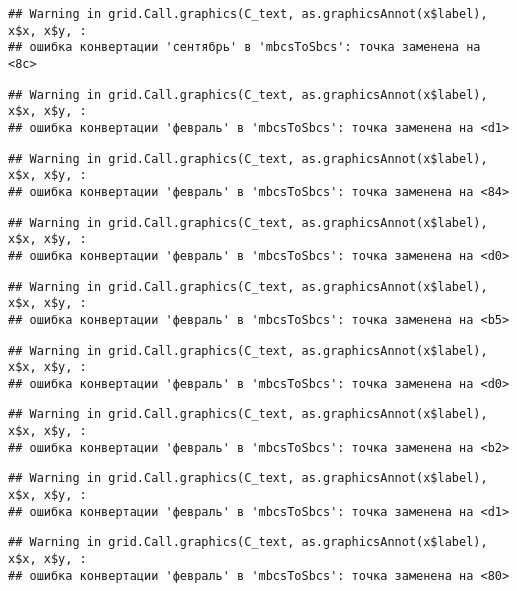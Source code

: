 \documentclass[
]{article}
\begin{document}
\begin{verbatim}
## Warning in grid.Call.graphics(C_text, as.graphicsAnnot(x$label), x$x, x$y, :
## ошибка конвертации 'сентябрь' в 'mbcsToSbcs': точка заменена на <8c>
\end{verbatim}

\begin{verbatim}
## Warning in grid.Call.graphics(C_text, as.graphicsAnnot(x$label), x$x, x$y, :
## ошибка конвертации 'февраль' в 'mbcsToSbcs': точка заменена на <d1>
\end{verbatim}

\begin{verbatim}
## Warning in grid.Call.graphics(C_text, as.graphicsAnnot(x$label), x$x, x$y, :
## ошибка конвертации 'февраль' в 'mbcsToSbcs': точка заменена на <84>
\end{verbatim}

\begin{verbatim}
## Warning in grid.Call.graphics(C_text, as.graphicsAnnot(x$label), x$x, x$y, :
## ошибка конвертации 'февраль' в 'mbcsToSbcs': точка заменена на <d0>
\end{verbatim}

\begin{verbatim}
## Warning in grid.Call.graphics(C_text, as.graphicsAnnot(x$label), x$x, x$y, :
## ошибка конвертации 'февраль' в 'mbcsToSbcs': точка заменена на <b5>
\end{verbatim}

\begin{verbatim}
## Warning in grid.Call.graphics(C_text, as.graphicsAnnot(x$label), x$x, x$y, :
## ошибка конвертации 'февраль' в 'mbcsToSbcs': точка заменена на <d0>
\end{verbatim}

\begin{verbatim}
## Warning in grid.Call.graphics(C_text, as.graphicsAnnot(x$label), x$x, x$y, :
## ошибка конвертации 'февраль' в 'mbcsToSbcs': точка заменена на <b2>
\end{verbatim}

\begin{verbatim}
## Warning in grid.Call.graphics(C_text, as.graphicsAnnot(x$label), x$x, x$y, :
## ошибка конвертации 'февраль' в 'mbcsToSbcs': точка заменена на <d1>
\end{verbatim}

\begin{verbatim}
## Warning in grid.Call.graphics(C_text, as.graphicsAnnot(x$label), x$x, x$y, :
## ошибка конвертации 'февраль' в 'mbcsToSbcs': точка заменена на <80>
\end{verbatim}
\end{document}
